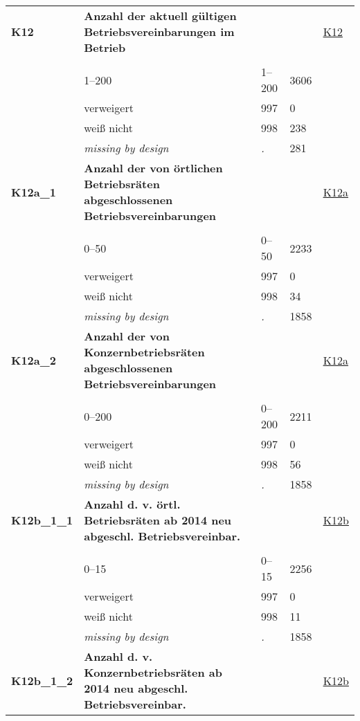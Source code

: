 \begin{longtable}{| L{2.65cm} | L{8cm} | C{1.5cm} | R{1.25cm} | C{2.25cm}  |}
   \midrule
\textbf{K12}\label{var:K12} & \textbf{Anzahl der aktuell gültigen Betriebsvereinbarungen im Betrieb} &  &  & \hyperref[K12]{K12} \\ 
   &  &  &  &  \\ 
   & 1--200 & 1--200 & 3606 &  \\ 
   & verweigert & 997 & 0 &  \\ 
   & weiß nicht & 998 & 238 &  \\ 
   & \textit{missing by design} & \textit{.} & 281 &  \\ 
   \midrule
\textbf{K12a\_1}\label{var:K12a:1} & \textbf{Anzahl der von örtlichen Betriebsräten abgeschlossenen Betriebsvereinbarungen} &  &  & \hyperref[K12a]{K12a} \\ 
   &  &  &  &  \\ 
   & 0--50 & 0--50 & 2233 &  \\ 
   & verweigert & 997 & 0 &  \\ 
   & weiß nicht & 998 & 34 &  \\ 
   & \textit{missing by design} & \textit{.} & 1858 &  \\ 
   \midrule
\textbf{K12a\_2}\label{var:K12a:2} & \textbf{Anzahl der von Konzernbetriebsräten abgeschlossenen Betriebsvereinbarungen} &  &  & \hyperref[K12a]{K12a} \\ 
   &  &  &  &  \\ 
   & 0--200 & 0--200 & 2211 &  \\ 
   & verweigert & 997 & 0 &  \\ 
   & weiß nicht & 998 & 56 &  \\ 
   & \textit{missing by design} & \textit{.} & 1858 &  \\ 
   \midrule
\textbf{K12b\_1\_1}\label{var:K12b:1:1} & \textbf{Anzahl d. v. örtl. Betriebsräten ab 2014 neu abgeschl. Betriebsvereinbar.} &  &  & \hyperref[K12b]{K12b} \\ 
   &  &  &  &  \\ 
   & 0--15 & 0--15 & 2256 &  \\ 
   & verweigert & 997 & 0 &  \\ 
   & weiß nicht & 998 & 11 &  \\ 
   & \textit{missing by design} & \textit{.} & 1858 &  \\ 
   \midrule
\textbf{K12b\_1\_2}\label{var:K12b:1:2} & \textbf{Anzahl d. v. Konzernbetriebsräten ab 2014 neu abgeschl. Betriebsvereinbar.} &  &  & \hyperref[K12b]{K12b} \\ 

\end{longtable}
